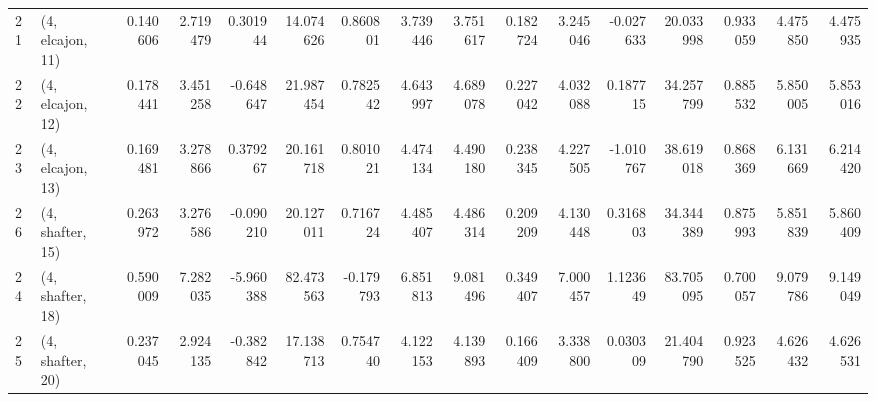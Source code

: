 \begin{tabular}{llrrrrrrrrrrrrrr}
21 &  (4, elcajon, 11) &   0.140606 &  2.719479 &  0.301944 &  14.074626 &  0.860801 &   3.739446 &  3.751617 &  0.182724 &  3.245046 & -0.027633 &   20.033998 &  0.933059 &   4.475850 &   4.475935 \\
22 &  (4, elcajon, 12) &   0.178441 &  3.451258 & -0.648647 &  21.987454 &  0.782542 &   4.643997 &  4.689078 &  0.227042 &  4.032088 &  0.187715 &   34.257799 &  0.885532 &   5.850005 &   5.853016 \\
23 &  (4, elcajon, 13) &   0.169481 &  3.278866 &  0.379267 &  20.161718 &  0.801021 &   4.474134 &  4.490180 &  0.238345 &  4.227505 & -1.010767 &   38.619018 &  0.868369 &   6.131669 &   6.214420 \\
26 &  (4, shafter, 15) &   0.263972 &  3.276586 & -0.090210 &  20.127011 &  0.716724 &   4.485407 &  4.486314 &  0.209209 &  4.130448 &  0.316803 &   34.344389 &  0.875993 &   5.851839 &   5.860409 \\
24 &  (4, shafter, 18) &   0.590009 &  7.282035 & -5.960388 &  82.473563 & -0.179793 &   6.851813 &  9.081496 &  0.349407 &  7.000457 &  1.123649 &   83.705095 &  0.700057 &   9.079786 &   9.149049 \\
25 &  (4, shafter, 20) &   0.237045 &  2.924135 & -0.382842 &  17.138713 &  0.754740 &   4.122153 &  4.139893 &  0.166409 &  3.338800 &  0.030309 &   21.404790 &  0.923525 &   4.626432 &   4.626531 \\
\bottomrule
\end{tabular}
